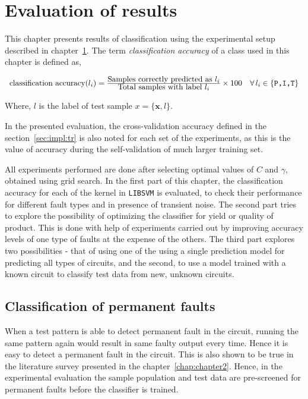 \chapter{Evaluation of results}
\label{chap:chapter6}
This chapter presents results of classification using the experimental setup described in chapter~\ref{chap:chapter6}. The term \emph{classification accuracy} of a class used in this chapter is defined as,

\[ \begin{array}{ll} \mbox{classification accuracy}(l_i) = \frac{\mbox{Samples correctly predicted as $l_i$}}
								{\mbox{Total samples with label $l_i$}}
							\times 100 & 
							\forall \,l_i \in \{\mbox{\texttt{P,I,T}}\} 
	\end{array}\]

Where, $l$ is the label of test sample $x=\{\boldsymbol{x},l\}$.

In the presented evaluation, the cross-validation accuracy defined in the section~\ref{sec:impl:tr} is also noted for each set of the experiments, as this is the value of accuracy during the self-validation of much larger training set.

All experiments performed are done after selecting optimal values of $C$ and $\gamma$, obtained using grid search. In the first part of this chapter, the classification accuracy for each of the kernel in \texttt{LIBSVM} is evaluated, to check their performance for different fault types and in presence of transient noise. The second part tries to explore the possibility of optimizing the classifier for yield or quality of product. This is done with help of experiments carried out by improving accuracy levels of one type of faults at the expense of the others. The third part explores two possibilities - that of using one of the using a single prediction model for predicting all types of circuits, and the second, to use a model trained with a known circuit to classify test data from new, unknown circuits.

\section{Classification of permanent faults}
\label{sec:wp}
When a test pattern is able to detect permanent fault in the circuit, running the same pattern again would result in same faulty output every time. Hence it is easy to detect a permanent fault in the circuit. This is also shown to be true in the literature survey presented in the chapter~\ref{chap:chapter2}. Hence, in the experimental evaluation the sample population and test data are pre-screened for permanent faults before the classifier is trained.


